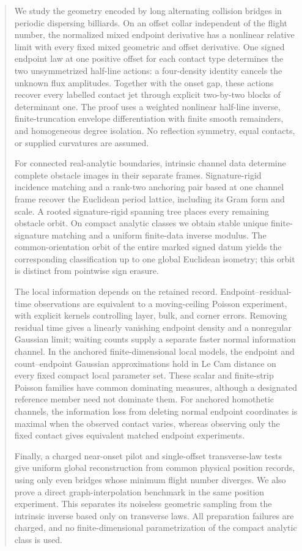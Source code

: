 \begin{abstract}
We study the geometry encoded by long alternating collision bridges in
periodic dispersing billiards.  On an offset collar independent of the flight
number, the normalized mixed endpoint derivative has a nonlinear relative
limit with every fixed mixed geometric and offset derivative.  One signed
endpoint law at one positive offset for each contact type determines the two
unsymmetrized half-line actions: a four-density identity cancels the unknown
flux amplitudes.  Together with the onset gap, these actions recover every
labelled contact jet through explicit two-by-two blocks of determinant one.
The proof uses a weighted nonlinear half-line inverse, finite-truncation
envelope differentiation with finite smooth remainders, and homogeneous
degree isolation.  No reflection
symmetry, equal contacts, or supplied curvatures are assumed.

For connected real-analytic boundaries, intrinsic channel data determine
complete obstacle images in their separate frames.  Signature-rigid incidence
matching and a rank-two anchoring pair based at one channel frame recover
the Euclidean period lattice, including its Gram form and scale.  A rooted
signature-rigid spanning tree places every remaining obstacle orbit.  On compact analytic
classes we obtain stable unique finite-signature matching and a uniform
finite-data inverse modulus.  The common-orientation orbit of the entire
marked signed datum yields the corresponding classification up to one global
Euclidean isometry; this orbit is distinct from pointwise sign erasure.

The local information depends on the retained record.  Endpoint--residual-time
observations are equivalent to a moving-ceiling Poisson experiment, with
explicit kernels controlling layer, bulk, and corner errors.  Removing
residual time gives a linearly vanishing endpoint density and a nonregular
Gaussian limit; waiting counts supply a separate faster normal information
channel.  In the anchored finite-dimensional local models, the endpoint and
count--endpoint Gaussian approximations hold in Le Cam distance on every
fixed compact local parameter set.  These scalar and finite-strip Poisson
families have common dominating measures, although a designated reference
member need not dominate them.  For anchored homothetic channels, the
information loss from deleting normal endpoint coordinates is maximal when
the observed contact varies, whereas observing only the fixed contact gives
equivalent matched endpoint experiments.

Finally, a charged near-onset pilot and single-offset transverse-law tests
give uniform global reconstruction from common physical position records,
using only even bridges whose minimum flight number diverges.  We also prove
a direct graph-interpolation benchmark in the same position experiment.
This separates its noiseless geometric sampling from the intrinsic inverse
based only on transverse laws.  All preparation failures are charged, and
no finite-dimensional parametrization of the compact analytic class is used.
\end{abstract}
